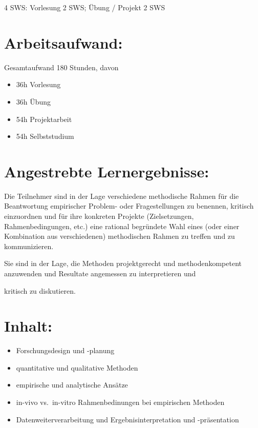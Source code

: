 4 SWS: Vorlesung 2 SWS; Übung / Projekt 2 SWS

\section*{Arbeitsaufwand:\label{/mi-2017/modulbeschreibungen-master/MA_All_Research_Methods}}\label{arbeitsaufwandpathlabelmi-2017modulbeschreibungen-mastermaux5fallux5fresearchux5fmethods}

Gesamtaufwand 180 Stunden, davon

\begin{itemize}
\tightlist
\item
  36h Vorlesung
\item
  36h Übung
\item
  54h Projektarbeit
\item
  54h Selbststudium
\end{itemize}

\section*{Angestrebte
Lernergebnisse:\label{/mi-2017/modulbeschreibungen-master/MA_All_Research_Methods}}\label{angestrebte-lernergebnissepathlabelmi-2017modulbeschreibungen-mastermaux5fallux5fresearchux5fmethods}

Die Teilnehmer sind in der Lage verschiedene methodische Rahmen für die
Beantwortung empirischer Problem- oder Fragestellungen zu benennen,
kritisch einzuordnen und für ihre konkreten Projekte (Zielsetzungen,
Rahmenbedingungen, etc.) eine rational begründete Wahl eines (oder einer
Kombination aus verschiedenen) methodischen Rahmen zu treffen und zu
kommunizieren.

Sie sind in der Lage, die Methoden projektgerecht und methodenkompetent
anzuwenden und Resultate angemessen zu interpretieren und

kritisch zu diskutieren.

\section*{Inhalt:\label{/mi-2017/modulbeschreibungen-master/MA_All_Research_Methods}}\label{inhaltpathlabelmi-2017modulbeschreibungen-mastermaux5fallux5fresearchux5fmethods}

\begin{itemize}
\tightlist
\item
  Forschungsdesign und -planung
\item
  quantitative und qualitative Methoden
\item
  empirische und analytische Ansätze
\item
  in-vivo vs.~in-vitro Rahmenbedinungen bei empirischen Methoden
\item
  Datenweiterverarbeitung und Ergebnisinterpretation und -präsentation
\end{itemize}


